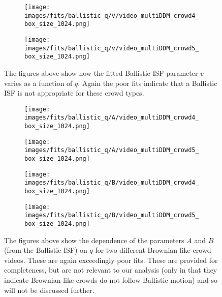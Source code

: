 \documentclass[10pt]{article}
\begin{document}
\begin{figure}[H]
\begin{subfigure}[t]{.5\textwidth}
  \centering
  \texttt{[image: images/fits/ballistic\_q/v/video\_multiDDM\_crowd4\_box\_size\_1024.png]}
  \caption{}
\end{subfigure}%
\hfill
\begin{subfigure}[t]{.5\textwidth}
  \centering
  \texttt{[image: images/fits/ballistic\_q/v/video\_multiDDM\_crowd5\_box\_size\_1024.png]}
  \caption{}
\end{subfigure}
\caption{The figures above show how the fitted Ballistic ISF parameter $v$ varies as a function of $q$. Again the poor fits indicate that a Ballistic ISF is not appropriate for these crowd types.}
\label{fig:crowd_ballistic_fits_v}
\end{figure}

\begin{figure}[H]
\begin{subfigure}[t]{.5\textwidth}
  \centering
  \texttt{[image: images/fits/ballistic\_q/A/video\_multiDDM\_crowd4\_box\_size\_1024.png]}
  \caption{}
\end{subfigure}%
\hfill
\begin{subfigure}[t]{.5\textwidth}
  \centering
  \texttt{[image: images/fits/ballistic\_q/A/video\_multiDDM\_crowd5\_box\_size\_1024.png]}
  \caption{}
\end{subfigure}
\label{fig:crowd_ballistic_fits_A}
\par\bigskip
\begin{subfigure}[t]{.5\textwidth}
  \centering
  \texttt{[image: images/fits/ballistic\_q/B/video\_multiDDM\_crowd4\_box\_size\_1024.png]}
  \caption{}
\end{subfigure}%
\hfill
\begin{subfigure}[t]{.5\textwidth}
  \centering
  \texttt{[image: images/fits/ballistic\_q/B/video\_multiDDM\_crowd5\_box\_size\_1024.png]}
  \caption{}
\end{subfigure}
\caption{The figures above show the dependence of the parameters $A$ and $B$ (from the Ballistic ISF) on $q$ for two different Brownian-like crowd videos. These are again exceedingly poor fits. These are provided for completeness, but are not relevant to our analysis (only in that they indicate Brownian-like crowds do not follow Ballistic motion) and so will not be discussed further.}
\label{fig:crowd_ballistic_fits_B}
\end{figure}
\end{document}
